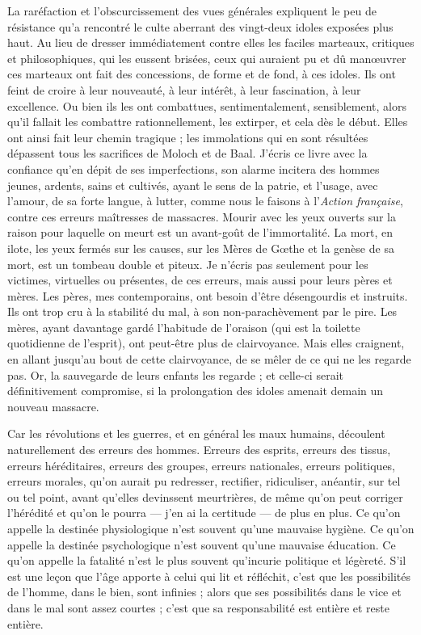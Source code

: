 \documentclass[french,twoside]{book} %
\begin{document}
La raréfaction et l’obscurcissement des vues générales expliquent le peu de résistance qu’a rencontré le culte aberrant des vingt-deux idoles exposées plus haut. Au lieu de dresser immédiatement contre elles les faciles marteaux, critiques et philosophiques, qui les eussent brisées, ceux qui auraient pu et dû manœuvrer ces marteaux ont fait des concessions, de forme et de fond, à ces idoles. Ils ont feint de croire à leur nouveauté, à leur intérêt, à leur fascination, à leur excellence. Ou bien ils les ont combattues, sentimentalement, sensiblement, alors qu’il fallait les combattre rationnellement, les extirper, et cela dès le début. Elles ont ainsi fait leur chemin tragique ; les immolations qui en sont résultées dépassent tous les sacrifices de Moloch et de Baal. J’écris ce livre avec la confiance qu’en dépit de ses imperfections, son alarme incitera des hommes jeunes, ardents, sains et cultivés, ayant le sens de la patrie, et l’usage, avec l’amour, de sa forte langue, à lutter, comme nous le faisons à l’{\itshape Action française}, contre ces erreurs maîtresses de massacres. Mourir avec les yeux ouverts sur la raison pour laquelle on meurt est un avant-goût de l’immortalité. La mort, en ilote, les yeux fermés sur les causes, sur les Mères de Gœthe et la genèse de sa mort, est un tombeau double et piteux. Je n’écris pas seulement pour les victimes, virtuelles ou présentes, de ces erreurs, mais aussi pour leurs pères et mères. Les pères, mes contemporains, ont besoin d’être désengourdis et instruits. Ils ont trop cru à la stabilité du mal, à son non-parachèvement par le pire. Les mères, ayant davantage gardé l’habitude de l’oraison (qui est la toilette quotidienne de l’esprit), ont peut-être plus de clairvoyance. Mais elles craignent, en allant jusqu’au bout de cette clairvoyance, de se mêler de ce qui ne les regarde pas. Or, la sauvegarde de leurs enfants les regarde ; et celle-ci serait définitivement compromise, si la prolongation des idoles amenait demain un nouveau massacre.\par
Car les révolutions et les guerres, et en général les maux humains, découlent naturellement des erreurs des hommes. Erreurs des esprits, erreurs des tissus, erreurs héréditaires, erreurs des groupes, erreurs nationales, erreurs politiques, erreurs morales, qu’on aurait pu redresser, rectifier, ridiculiser, anéantir, sur tel ou tel point, avant qu’elles devinssent meurtrières, de même qu’on peut corriger l’hérédité et qu’on le pourra — j’en ai la certitude — de plus en plus. Ce qu’on appelle la destinée physiologique n’est souvent qu’une mauvaise hygiène. Ce qu’on appelle la destinée psychologique n’est souvent qu’une mauvaise éducation. Ce qu’on appelle la fatalité n’est le plus souvent qu’incurie politique et légèreté. S’il est une leçon que l’âge apporte à celui qui lit et réfléchit, c’est que les possibilités de l’homme, dans le bien, sont infinies ; alors que ses possibilités dans le vice et dans le mal sont assez courtes ; c’est que sa responsabilité est entière et reste entière.\par
\end{document}
